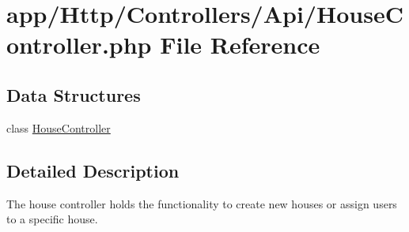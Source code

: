 \hypertarget{_house_controller_8php}{}\section{app/\+Http/\+Controllers/\+Api/\+House\+Controller.php File Reference}
\label{_house_controller_8php}
\subsection*{Data Structures}
\begin{DoxyCompactItemize}
\item 
class \mbox{\hyperlink{class_app_1_1_http_1_1_controllers_1_1_a_p_i_1_1_house_controller}{House\+Controller}}
\end{DoxyCompactItemize}


\subsection{Detailed Description}
The house controller holds the functionality to create new houses or assign users to a specific house. 